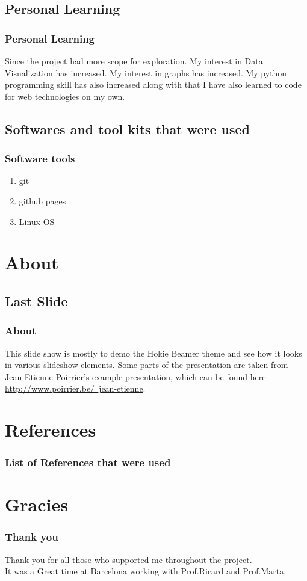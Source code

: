 \documentclass{beamer}
\begin{document}
\subsection{Personal Learning}

\frame
{
	\frametitle{Personal Learning}
Since the project had more scope for exploration.
My interest in Data Visualization has increased.
My interest in graphs has increased.
My python programming skill has also increased along with that I have also learned to code for web technologies on my own.
}

\subsection{Softwares and tool kits that were used}

\frame
{
	\frametitle{Software tools}
	\begin{enumerate}
		\item git
		\item github pages
		\item Linux OS
	\end{enumerate}
}


\section{About}
\subsection{Last Slide}

\frame
{
	\frametitle{About}

	This slide show is mostly to demo the Hokie Beamer theme and see how it looks in various slideshow elements.  Some parts of the presentation are taken from Jean-Etienne Poirrier's example presentation, which can be found here:  \href{http://www.poirrier.be/~jean-etienne}{http://www.poirrier.be/~jean-etienne}.
	
	

{}
}

\section{References}

\frame
{
	\frametitle{List of References that were used}


{}
}
\section{Gracies}

\frame
{
	\frametitle{Thank you}
Thank you for all those who supported me throughout the project.\\
It was a Great time at Barcelona working with Prof.Ricard and Prof.Marta.

{}
}
\end{document}
